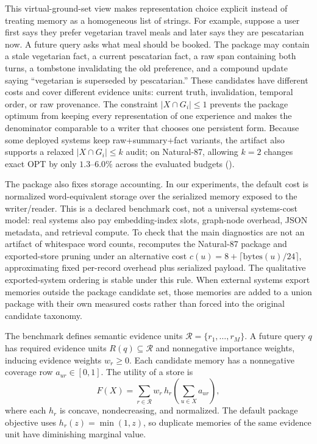 \documentclass{article}
\theoremstyle{remark}
\theoremstyle{plain}
\newcommand{\units}{\mathcal{R}}
\begin{document}
This virtual-ground-set view makes representation choice explicit instead of treating memory as a homogeneous list of strings. For example, suppose a user first says they prefer vegetarian travel meals and later says they are pescatarian now. A future query asks what meal should be booked. The package may contain a stale vegetarian fact, a current pescatarian fact, a raw span containing both turns, a tombstone invalidating the old preference, and a compound update saying ``vegetarian is superseded by pescatarian.'' These candidates have different costs and cover different evidence units: current truth, invalidation, temporal order, or raw provenance. The constraint $|X\cap G_i|\leq1$ prevents the package optimum from keeping every representation of one experience and makes the denominator comparable to a writer that chooses one persistent form. Because some deployed systems keep raw+summary+fact variants, the artifact also supports a relaxed $|X\cap G_i|\leq k$ audit; on Natural-87, allowing $k=2$ changes exact OPT by only $1.3$--$6.0\%$ across the evaluated budgets ().

The package also fixes storage accounting. In our experiments, the default cost is normalized word-equivalent storage over the serialized memory exposed to the writer/reader. This is a declared benchmark cost, not a universal systems-cost model: real systems also pay embedding-index slots, graph-node overhead, JSON metadata, and retrieval compute. To check that the main diagnostics are not an artifact of whitespace word counts,  recomputes the Natural-87 package and exported-store pruning under an alternative cost $c(u)=8+\lceil\mathrm{bytes}(u)/24\rceil$, approximating fixed per-record overhead plus serialized payload. The qualitative exported-system ordering is stable under this rule. When external systems export memories outside the package candidate set, those memories are added to a union package with their own measured costs rather than forced into the original candidate taxonomy.

The benchmark defines semantic evidence units $\units=\{r_1,\ldots,r_M\}$. A future query $q$ has required evidence units $R(q)\subseteq\units$ and nonnegative importance weights, inducing evidence weights $w_r\geq0$. Each candidate memory has a nonnegative coverage row $a_{ur}\in[0,1]$. The utility of a store is
\begin{equation}
F(X)=\sum_{r\in\units} w_r\,
h_r\!\left(\sum_{u\in X}a_{ur}\right),
\label{eq:coverage}
\end{equation}
where each $h_r$ is concave, nondecreasing, and normalized. The default package objective uses $h_r(z)=\min(1,z)$, so duplicate memories of the same evidence unit have diminishing marginal value.
\end{document}
